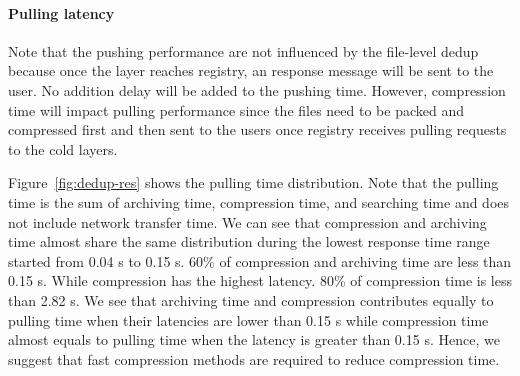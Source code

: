 \paragraph{Pulling latency}
Note that the pushing performance are not influenced by the file-level dedup because once the layer reaches registry, an response message will be sent to the user. No addition delay will be added to the pushing time. However, compression time will impact pulling performance since the files need to be packed and compressed first and then sent to the users once registry receives pulling requests to the cold layers. 

Figure~\ref{fig:dedup-res} shows the pulling time distribution. Note that the pulling time is the sum of archiving time, compression time, and searching time and does not include network transfer time. We can see that 
compression and archiving time almost share the same distribution during the lowest response time range started from 0.04 s to 0.15 s. 60\% of compression and archiving time are less than 0.15 s. While compression has the highest latency. 80\% of compression time is less than 2.82 s. We see that archiving time and compression contributes equally to pulling time when their latencies are lower than 0.15 s while compression time almost equals to pulling time when the latency is greater than 0.15 s. Hence, we suggest that fast compression methods are required to reduce compression time.  
 


